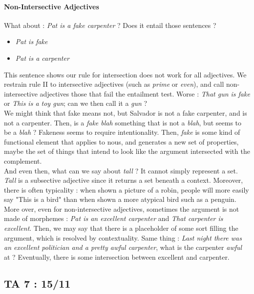 \documentclass{cours}
\begin{document}
\paragraph{Non-Intersective Adjectives}
What about\! : \textsl{Pat is a fake carpenter} ? Does it entail those sentences ?
\begin{itemize}
    \item \textsl{Pat is fake}
    \item \textsl{Pat is a carpenter}
\end{itemize}
This sentence shows our rule for intersection does not work for all adjectives. We restrain rule II to intersective adjectives (such as \textsl{prime} or \textsl{even}), and call non-intersective adjectives those that fail the entailment test. Worse\! : \textsl{That gun is fake} or \textsl{This is a toy gun}; can we then call it a \textsl{gun} ?\\
We might think that fake means not, but Salvador is not a fake carpenter, and is not a carpenter. Then, is a \textsl{fake blah} something that is not a \textsl{blah}, but seems to be a \textsl{blah} ? Fakeness seems to require intentionality. Then, \textsl{fake} is some kind of functional element that applies to nous, and generates a new set of properties, maybe the set of things that intend to look like the argument intersected with the complement.\\
And even then, what can we say about \textsl{tall} ? It cannot simply represent a set. \textsl{Tall} is a subsective adjective since it returns a set beneath a context. Moreover, there is often typicality\! : when shown a picture of a robin, people will more easily say "This is a bird" than when shown a more atypical bird such as a penguin.\\
More over, even for non-intersective adjectives, sometimes the argument is not made of morphemes\! : \textsl{Pat is an excellent carpenter} and \textsl{That carpenter is excellent}. Then, we may say that there is a placeholder of some sort filling the argument, which is resolved by contextuality. Same thing\! : \textsl{Last night there was an excellent politician and a pretty awful carpenter}, what is the carpenter \textsl{awful} at ? Eventually, there is some intersection between excellent and carpenter.


\subsection{TA 7\! : 15/11}
\end{document}
